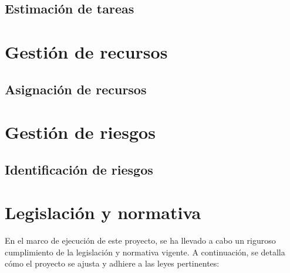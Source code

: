 \documentclass[12pt,a4paper,onecolumn,oneside]{report}
\begin{document}
\subsection{Estimación de tareas}
\label{Estimación de tareas}



\section{Gestión de recursos}
\label{Gestión de recursos}

\subsection{Asignación de recursos}
\label{asignacion de recursos}




\section{Gestión de riesgos}

\subsection{Identificación de riesgos}


\section{Legislación y normativa}

En el marco de ejecución de este proyecto, se ha llevado a cabo un riguroso cumplimiento de la legislación y normativa vigente. A continuación, se detalla cómo el proyecto se ajusta y adhiere a las leyes pertinentes:
\end{document}
